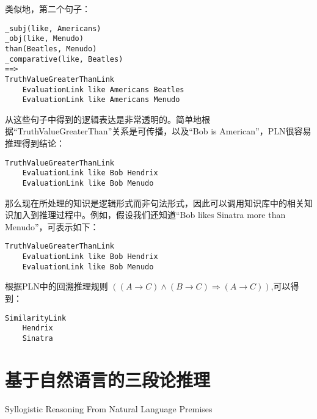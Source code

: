 \noindent 类似地，第二个句子：

 {\tt\begin{small}\begin{lstlisting}
_subj(like, Americans)
_obj(like, Menudo)
than(Beatles, Menudo)
_comparative(like, Beatles)
==>
TruthValueGreaterThanLink
    EvaluationLink like Americans Beatles
    EvaluationLink like Americans Menudo
\end{lstlisting}\end{small}}

从这些句子中得到的逻辑表达是非常透明的。简单地根据“TruthValueGreaterThan”关系是可传播，以及“Bob is American”，PLN很容易推理得到结论：

 {\tt\begin{small}\begin{lstlisting}
TruthValueGreaterThanLink
    EvaluationLink like Bob Hendrix
    EvaluationLink like Bob Menudo
  \end{lstlisting}\end{small}}
  
那么现在所处理的知识是逻辑形式而非句法形式，因此可以调用知识库中的相关知识加入到推理过程中。例如，假设我们还知道“Bob likes Sinatra more than Menudo”，可表示如下：
    
     {\tt\begin{small}\begin{lstlisting}
TruthValueGreaterThanLink
    EvaluationLink like Bob Hendrix
    EvaluationLink like Bob Menudo
  \end{lstlisting}\end{small}}
  
  
  \noindent 根据PLN中的回溯推理规则 $\left((A\rightarrow C) \wedge (B\rightarrow C) \Rightarrow(A\rightarrow C)\right)$,可以得到：
  
     {\tt\begin{small}\begin{lstlisting}
SimilarityLink
    Hendrix
    Sinatra
  \end{lstlisting}\end{small}}
  
 

\section{基于自然语言的三段论推理}{Syllogistic Reasoning From Natural Language Premises}

